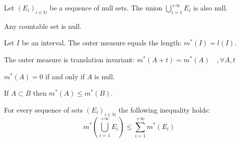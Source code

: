         \begin{theorem}
		Let $(E_i)_{i\in\mathbb{N}}$ be a sequence of null sets. The union $\bigcup_{i=1}^{+\infty}E_i$ is also null.
	\end{theorem}
        \begin{result}\label{lebesgue:theorem:countable_set_is_null}
        	Any countable set is null.
        \end{result}
    
        
        \begin{property}
		Let $I$ be an interval. The outer measure equals the length: $m^*(I) = l(I)$.
	\end{property}
        \begin{property}
		The outer measure is translation invariant: $m^*(A + t) = m^*(A)\quad,\forall A,t$
	\end{property}
        \begin{property}
		$m^*(A) = 0$ if and only if $A$ is null.
	\end{property}
        \begin{property}
		If $A\subset B$ then $m^*(A)\leq m^*(B)$.
	\end{property}
        \begin{property}
        	For every sequence of sets $(E_i)_{i\in\mathbb{N}}$ the following inequality holds: 
		\begin{equation}
			m^*\left(\bigcup_{i=1}^{+\infty}E_i\right) \leq \sum_{i=1}^{+\infty}m^*(E_i)
		\end{equation}
	\end{property}
        

